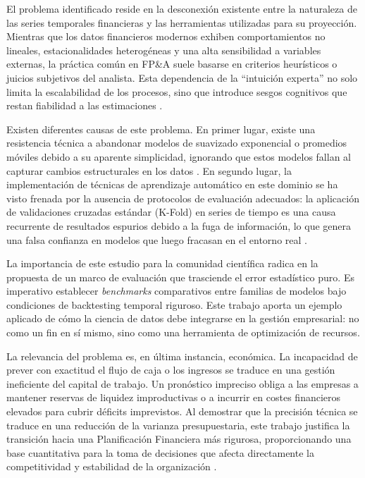 El problema identificado reside en la desconexión existente entre la naturaleza de las series temporales financieras y las herramientas utilizadas para su proyección. Mientras que los datos financieros modernos exhiben comportamientos no lineales, estacionalidades heterogéneas y una alta sensibilidad a variables externas, la práctica común en FP\&A suele basarse en criterios heurísticos o juicios subjetivos del analista. Esta dependencia de la ``intuición experta'' no solo limita la escalabilidad de los procesos, sino que introduce sesgos cognitivos que restan fiabilidad a las estimaciones \parencite{Armstrong2001}.

Existen diferentes causas de este problema. En primer lugar, existe una resistencia técnica a abandonar modelos de suavizado exponencial o promedios móviles debido a su aparente simplicidad, ignorando que estos modelos fallan al capturar cambios estructurales en los datos \parencite{Hyndman2021}. En segundo lugar, la implementación de técnicas de aprendizaje automático en este dominio se ha visto frenada por la ausencia de protocolos de evaluación adecuados: la aplicación de validaciones cruzadas estándar (K-Fold) en series de tiempo es una causa recurrente de resultados espurios debido a la fuga de información, lo que genera una falsa confianza en modelos que luego fracasan en el entorno real \parencite{Bergmeir2012}.

La importancia de este estudio para la comunidad científica radica en la propuesta de un marco de evaluación que trasciende el error estadístico puro. Es imperativo establecer \textit{benchmarks} comparativos entre familias de modelos bajo condiciones de backtesting temporal riguroso. Este trabajo aporta un ejemplo aplicado de cómo la ciencia de datos debe integrarse en la gestión empresarial: no como un fin en sí mismo, sino como una herramienta de optimización de recursos.

La relevancia del problema es, en última instancia, económica. La incapacidad de prever con exactitud el flujo de caja o los ingresos se traduce en una gestión ineficiente del capital de trabajo. Un pronóstico impreciso obliga a las empresas a mantener reservas de liquidez improductivas o a incurrir en costes financieros elevados para cubrir déficits imprevistos. Al demostrar que la precisión técnica se traduce en una reducción de la varianza presupuestaria, este trabajo justifica la transición hacia una Planificación Financiera más rigurosa, proporcionando una base cuantitativa para la toma de decisiones que afecta directamente la competitividad y estabilidad de la organización \parencite{Fildes2022}.


